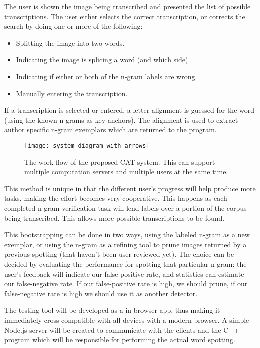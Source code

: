 \documentclass[ms]{byuprop}
\begin{document}
{\begin{addmargin}[3em]{3em}
The user is shown the image being transcribed and presented the list of possible transcriptions. The user either selects the correct transcription, or corrects the search by doing one or more of the following:
\begin{itemize}
    \item Splitting the image into two words.
    \item Indicating the image is splicing a word (and which side).
    \item Indicating if either or both of the n-gram labels are wrong.
    \item Manually entering the transcription.
\end{itemize}
If a transcription is selected or entered, a letter alignment is guessed for the word (using the known n-grams as key anchors). The alignment is used to extract author specific n-gram exemplars which are returned to the program.
\\[.5cm]
\end{addmargin}
}

\begin{figure}[h]
    \centering
    \texttt{[image: system\_diagram\_with\_arrows]}
    \caption{The work-flow of the proposed CAT system. This can support multiple computation servers and multiple users at the same time.}
    \label{fig:system_diagram}
\end{figure}

This method is unique in that the different user's progress will help produce more tasks, making the effort becomes very cooperative. This happens as each completed n-gram verification task will lend labels over a portion of the corpus being transcribed. This allows more possible transcriptions to be found.

This bootstrapping can be done in two ways, using the labeled n-gram as a new exemplar, or using the n-gram as a refining tool to prune images returned by a previous spotting (that haven't been user-reviewed yet). The choice can be decided by evaluating the performance for spotting that particular n-gram: the user's feedback will indicate our false-positive rate, and statistics can estimate our false-negative rate. If our false-positive rate is high, we should prune, if our false-negative rate is high we should use it as another detector.

The testing tool will be developed as a in-browser app, thus making it immediately cross-compatible with all devices with a modern browser. A simple Node.js server will be created to communicate with the clients and the C++ program which will be responsible for performing the actual word spotting.
\end{document}
